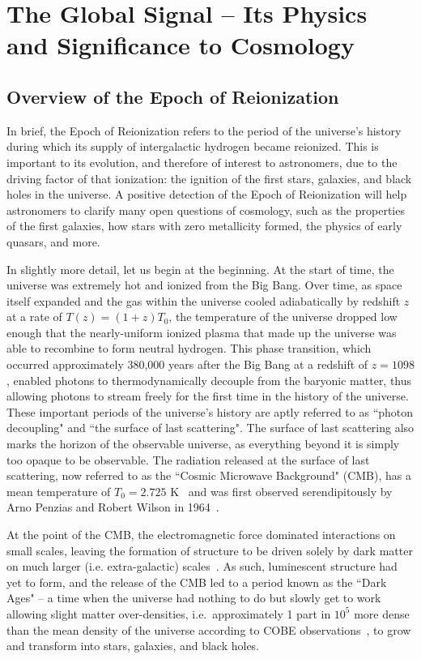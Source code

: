 \chapter{The Global Signal -- Its Physics and Significance to Cosmology}

\section{Overview of the Epoch of Reionization}
\label{sec:eor-overview}

In brief, the Epoch of Reionization refers to the period of the universe's 
history during which its supply of intergalactic hydrogen became reionized.  
This is important to its evolution, and therefore of interest to astronomers, 
due to the driving factor of that ionization: the ignition of the first stars, 
galaxies, and black holes in the universe. A positive detection of the Epoch of 
Reionization will help astronomers to clarify many open questions of cosmology, 
such as the properties of the first galaxies, how stars with zero metallicity 
formed, the physics of early quasars, and more.

In slightly more detail, let us begin at the beginning. At the start of time, 
the universe was extremely hot and ionized from the Big Bang. Over time, as 
space itself expanded and the gas within the universe cooled adiabatically
by redshift $z$ at a rate of $T(z) = (1+z)T_0$, the temperature of the universe 
dropped low enough that the nearly-uniform ionized plasma that made up the 
universe was able to recombine to form neutral hydrogen. This phase transition, 
which occurred approximately 380,000 years after the Big Bang at a redshift of 
$z = 1098$, enabled photons to thermodynamically decouple from the baryonic 
matter, thus allowing photons to stream freely for the first time in the 
history of the universe.  These important periods of the universe's history are 
aptly referred to as ``photon decoupling" and ``the surface of last 
scattering". The surface of last scattering also marks the horizon of the 
observable universe, as everything beyond it is simply too opaque to be 
observable. The radiation released at the surface of last scattering, now 
referred to as the ``Cosmic Microwave Background" (CMB), has a mean temperature 
of $T_0 = 2.725$ K~\citep{fixsen2009} and was first observed serendipitously by 
Arno Penzias and Robert Wilson in 1964~\citep{penzias-wilson1965}.  

At the point of the CMB, the electromagnetic force dominated interactions on 
small scales, leaving the formation of structure to be driven solely by dark 
matter on much larger (i.e. extra-galactic) scales~\citep{zaroubi2012}.  As 
such, luminescent structure had yet to form, and the release of the CMB led to 
a period known as the ``Dark Ages" -- a time when the universe had nothing to 
do but slowly get to work allowing slight matter over-densities, 
i.e.~approximately 1 part in $10^5$ more dense than the mean density of the 
universe according to COBE observations~\citep{smoot1992}, to grow and 
transform into stars, galaxies, and black holes.

